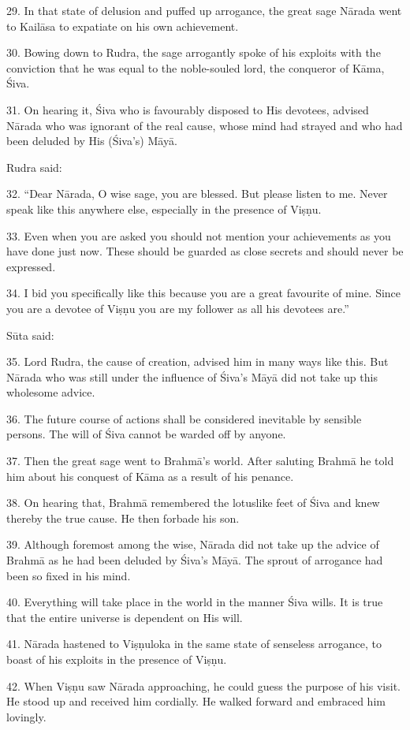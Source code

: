 29. In that state of delusion and puffed up arrogance, the great sage Nārada
went to Kailāsa to expatiate on his own achievement.

30. Bowing down to Rudra, the sage arrogantly spoke of his exploits with
the conviction that he was equal to the noble-souled lord, the conqueror of Kāma,
\ie Śiva.

31. On hearing it, Śiva who is favourably disposed to His devotees, advised
Nārada who was ignorant of the real cause, whose mind had strayed and who had
been deluded by His (Śiva’s) Māyā.

Rudra said:

32. “Dear Nārada, O wise sage, you are blessed. But please listen to me. Never
speak like this anywhere else, especially in the presence of Viṣṇu.

33. Even when you are asked you should not mention your achievements as you have
done just now. These should be guarded as close secrets and should never be
expressed.

34. I bid you specifically like this because you are a great favourite of mine.
Since you are a devotee of Viṣṇu you are my follower as all his devotees are.”

Sūta said:

35. Lord Rudra, the cause of creation, advised him in many ways like this. But
Nārada who was still under the influence of Śiva’s Māyā did not take up this
wholesome advice.

36. The future course of actions shall be considered inevitable by sensible
persons. The will of Śiva cannot be warded off by anyone.

37. Then the great sage went to Brahmā’s world. After saluting Brahmā he told
him about his conquest of Kāma as a result of his penance.

38. On hearing that, Brahmā remembered the lotuslike feet of Śiva and knew
thereby the true cause. He then forbade his son.

39. Although foremost among the wise, Nārada did not take up the advice of
Brahmā as he had been deluded by Śiva’s Māyā. The sprout of arrogance had been
so fixed in his mind.

40. Everything will take place in the world in the manner Śiva wills. It is true
that the entire universe is dependent on His will.

41. Nārada hastened to Viṣṇuloka in the same state of senseless arrogance, to
boast of his exploits in the presence of Viṣṇu.

42. When Viṣṇu saw Nārada approaching, he could guess the purpose of his visit.
He stood up and received him cordially. He walked forward and embraced him
lovingly.

